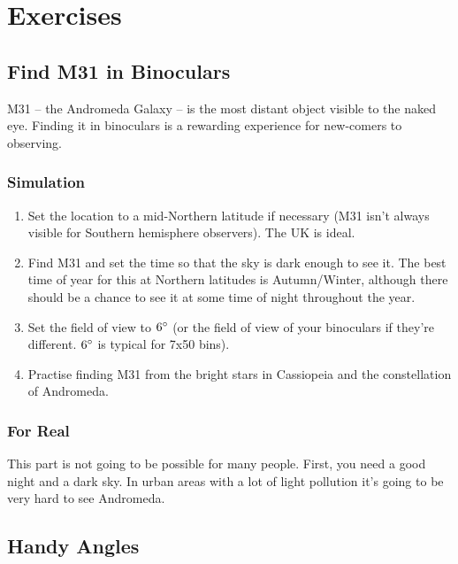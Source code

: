 
\chapter{Exercises}

\section{Find M31 in Binoculars}\label{find-m31-in-binoculars}

M31 -- the Andromeda Galaxy -- is the most distant object visible to the
naked eye. Finding it in binoculars is a rewarding experience for
new-comers to observing.

\subsection{Simulation}\label{simulation}

\begin{enumerate}
\item
  Set the location to a mid-Northern latitude if necessary (M31 isn't
  always visible for Southern hemisphere observers). The UK is ideal.
\item
  Find M31 and set the time so that the sky is dark enough to see it.
  The best time of year for this at Northern latitudes is Autumn/Winter,
  although there should be a chance to see it at some time of night
  throughout the year.
\item
  Set the field of view to $6\degree$ (or the field of view of your binoculars
  if they're different. $6\degree$ is typical for 7x50 bins).
\item
  Practise finding M31 from the bright stars in Cassiopeia and the
  constellation of Andromeda.
\end{enumerate}

\subsection{For Real}\label{for-real}

This part is not going to be possible for many people. First, you need a
good night and a dark sky. In urban areas with a lot of light pollution
it's going to be very hard to see Andromeda.

\section{Handy Angles}
\label{sec:Exercises:handyAngles}



